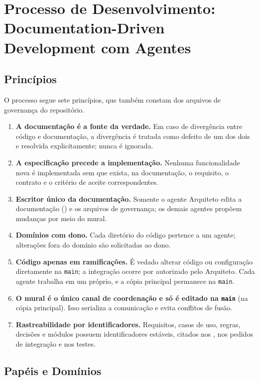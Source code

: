 \section{Processo de Desenvolvimento: Documentation-Driven Development com Agentes}\label{sec:processo-ddd}

\subsection{Princípios}\label{sec:principios-ddd}

O processo segue sete princípios, que também constam dos arquivos de governança do repositório.

\begin{enumerate}[label=\textbf{PR\arabic*.}, leftmargin=1.6cm]
  \item \textbf{A documentação é a fonte da verdade.} Em caso de divergência entre código e documentação, a divergência é tratada como defeito de um dos dois e resolvida explicitamente; nunca é ignorada.
  \item \textbf{A especificação precede a implementação.} Nenhuma funcionalidade nova é implementada sem que exista, na documentação, o requisito, o contrato e o critério de aceite correspondentes.
  \item \textbf{Escritor único da documentação.} Somente o agente Arquiteto edita a documentação () e os arquivos de governança; os demais agentes propõem mudanças por meio do mural.
  \item \textbf{Domínios com dono.} Cada diretório do código pertence a um agente; alterações fora do domínio são solicitadas ao dono.
  \item \textbf{Código apenas em ramificações.} É vedado alterar código ou configuração diretamente na \texttt{main}; a integração ocorre por  autorizado pelo Arquiteto. Cada agente trabalha em um  próprio, e a cópia principal permanece na \texttt{main}.
  \item \textbf{O mural é o único canal de coordenação e só é editado na \texttt{main}} (na cópia principal). Isso serializa a comunicação e evita conflitos de fusão.
  \item \textbf{Rastreabilidade por identificadores.} Requisitos, casos de uso, regras, decisões e módulos possuem identificadores estáveis, citados nos , nos pedidos de integração e nos testes.
\end{enumerate}

\subsection{Papéis e Domínios}\label{sec:papeis}

